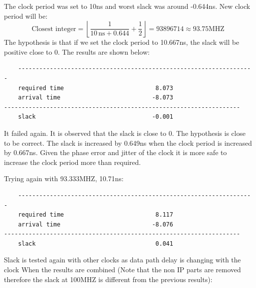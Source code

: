 \documentclass{report}
\begin{document}
The clock period was set to 10ns and worst slack was around -0.644ns. New clock period will be:
\[
\text{Closest integer} = \left\lfloor \frac{1}{10 \, \text{ns} + 0.644} + \frac{1}{2} \right\rfloor = 93896714 \approx 93.75 \text{MHZ}
\]
The hypothesis is that if we set the clock period to 10.667ns, the slack will be positive close to 0. The results are shown below:
\begin{verbatim}
    -------------------------------------------------------------------
    required time                          8.073    
    arrival time                          -8.073    
-------------------------------------------------------------------
    slack                                 -0.001
\end{verbatim}
It failed again. It is observed that the slack is close to 0. The hypothesis is close to be correct. The slack is increased by 0.649ns when the clock period is increased by 0.667ns. Given the phase error and jitter of the clock it is more safe to increase the clock period more than required.

Trying again with 93.333MHZ, 10.71ns:

\begin{verbatim}
    -------------------------------------------------------------------
    required time                          8.117    
    arrival time                          -8.076    
-------------------------------------------------------------------
    slack                                  0.041    
\end{verbatim}
Slack is tested again with other clocks as data path delay is changing with the clock When the results are combined (Note that the non IP parts are removed therefore the slack at 100MHZ is different from the previous results):

\text{}
\end{document}

